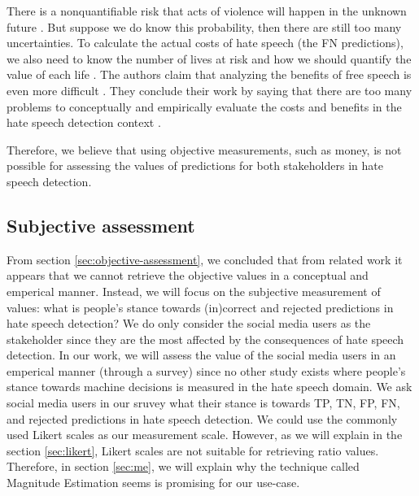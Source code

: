 %
There is a nonquantifiable risk that acts of violence will happen in the unknown future \citep{sunstein2018does}.
%
But suppose we do know this probability, then there are still too many uncertainties.
%
To calculate the actual costs of hate speech (the FN predictions), we also need to know the number of lives at risk and how we should quantify the value of each life \citep{sunstein2018does}.
%
The authors claim that analyzing the benefits of free speech is even more difficult \citep{sunstein2018does}.
%
They conclude their work by saying that there are too many problems to conceptually and empirically evaluate the costs and benefits in the hate speech detection context \citep{sunstein2018does}.
%

%
Therefore, we believe that using objective measurements, such as money, is not possible for assessing the values of predictions for both stakeholders in hate speech detection.
%

\subsection{Subjective assessment}
From section \ref{sec:objective-assessment}, we concluded that from related work it appears that we cannot retrieve the objective values in a conceptual and emperical manner.
%
Instead, we will focus on the subjective measurement of values: what is people's stance towards (in)correct and rejected predictions in hate speech detection?
%
We do only consider the social media users as the stakeholder since they are the most affected by the consequences of hate speech detection.
%
In our work, we will assess the value of the social media users in an emperical manner (through a survey) since no other study exists where people's stance towards machine decisions is measured in the hate speech domain.
%
We ask social media users in our sruvey what their stance is towards TP, TN, FP, FN, and rejected predictions in hate speech detection.
%
We could use the commonly used Likert scales as our measurement scale.
%
However, as we will explain in the section \ref{sec:likert}, Likert scales are not suitable for retrieving ratio values.
%
Therefore, in section \ref{sec:me}, we will explain why the technique called Magnitude Estimation seems is promising for our use-case.


